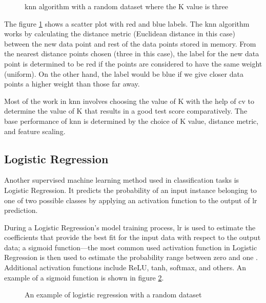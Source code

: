 \begin{figure}[ht]
    \centering
    \caption{\gls{knn} algorithm with a random dataset where the K value is three}
    \label{fig:knn}
\end{figure}

The figure \ref{fig:knn} shows a scatter plot with red and blue labels.
The \gls{knn} algorithm works by calculating the distance metric (Euclidean distance in this case) between the new data point and rest of the data points stored in memory.
From the nearest distance points chosen (three in this case), the label for the new data point is determined to be red if the points are considered to have the same weight (uniform).
On the other hand, the label would be blue if we give closer data points a higher weight than those far away.

Most of the work in \gls{knn} involves choosing the value of K with the help of \gls{cv} to determine the value of K that results in a good test score comparatively.
The base performance of \gls{knn} is determined by the choice of K value, distance metric, and feature scaling. \cite{ieee:knn}


\subsection{Logistic Regression}
Another supervised machine learning method used in classification tasks is Logistic Regression.
It predicts the probability of an input instance belonging to one of two possible classes by applying an activation function to the output of \gls{lr} prediction.

During a Logistic Regression's model training process, \gls{lr} is used to estimate the coefficients that provide the best fit for the input data with respect to the output data;
a sigmoid function---the most common used activation function in Logistic Regression is then used to estimate the probability range between zero and one \cite{ieee:logit}.
Additional activation functions include ReLU, tanh, softmax, and others. An example of a sigmoid function is shown in figure \ref{fig:logit}.

\begin{figure}[H]
    \centering
    \caption{An example of logistic regression with a random dataset}
    \label{fig:logit}
\end{figure}

